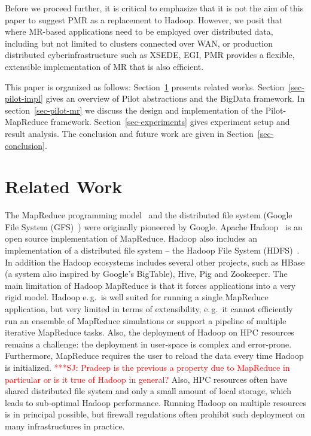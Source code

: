 \documentclass{acm_proc_article-sp}
\newcommand{\jhanote}[1]{ {\textcolor{red} { ***SJ: #1 }}}
\newcommand{\jhanote}[1]{}
\newcommand{\upp}{\vspace*{-0.5em}}
\newcommand{\pilot}{Pilot\xspace}
\newcommand{\pilotmapreduce}{Pilot-MapReduce\xspace}
\begin{document}
Before we proceed further, it is critical to emphasize that it is not
the aim of this paper to suggest PMR as a replacement to Hadoop.
However, we posit that where MR-based applications need to be employed
over distributed data, including but not limited to clusters connected
over WAN, or production distributed cyberinfrastructure such as XSEDE,
EGI, PMR provides a flexible, extensible implementation of MR that is
also efficient.
 

This paper is organized as follows: Section~\ref{sec:related_work} presents
related works. Section~\ref{sec-pilot-impl} gives an overview of \pilot
abstractions and the BigData framework. In section~\ref{sec-pilot-mr} we discuss
the design and implementation of the \pilotmapreduce framework.
Section~\ref{sec-experiments} gives experiment setup and result analysis. The
conclusion and future work are given in Section~\ref{sec-conclusion}.

\upp\upp

\section{Related Work}
\label{sec:related_work}
The MapReduce programming model~\cite{Dean:2004:MSD:1251254.1251264}
and the distributed file system (Google File System
(GFS)~\cite{Ghemawat:2003:GFS:1165389.945450}) were originally
pioneered by Google. Apache Hadoop~\cite{hadoop} is an open source
implementation of MapReduce. Hadoop also includes an implementation of
a distributed file system -- the Hadoop File System
(HDFS)~\cite{Borthakur:2007fk}. In addition the Hadoop ecosystems
includes several other projects, such as HBase (a system also inspired
by Google's BigTable), Hive, Pig and Zookeeper. The main limitation of
Hadoop MapReduce is that it forces applications into a very rigid
model. Hadoop e.\,g.\ is well suited for running a single MapReduce
application, but very limited in terms of extensibility, e.\,g.\ it
cannot efficiently run an ensemble of MapReduce simulations or support
a pipeline of multiple iterative MapReduce tasks. Also, the deployment
of Hadoop on HPC resources remains a challenge: the deployment in
user-space is complex and error-prone. Furthermore, MapReduce requires
the user to reload the data every time Hadoop is
initialized. \jhanote{Pradeep is the previous a property due to
  MapReduce in particular or is it true of Hadoop in general?} Also,
HPC resources often have shared distributed file system and only a
small amount of local storage, which leads to sub-optimal Hadoop
performance. Running Hadoop on multiple resources is in principal
possible, but firewall regulations often prohibit such deployment on
many infrastructures in practice.
\end{document}

